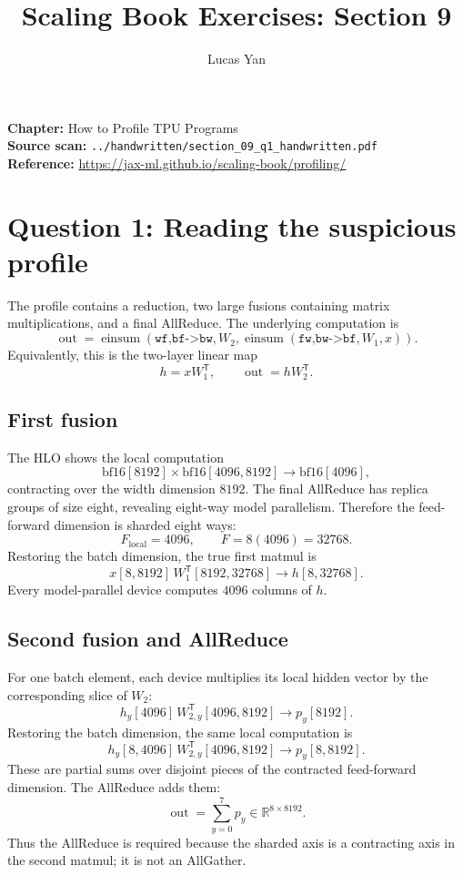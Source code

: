 \documentclass[11pt]{article}
\title{Scaling Book Exercises: Section 9}
\author{Lucas Yan}
\date{}
\begin{document}
\maketitle

\noindent
\textbf{Chapter:} How to Profile TPU Programs\\
\textbf{Source scan:} \texttt{../handwritten/section\_09\_q1\_handwritten.pdf}\\
\textbf{Reference:} \url{https://jax-ml.github.io/scaling-book/profiling/}

\section*{Question 1: Reading the suspicious profile}

The profile contains a reduction, two large fusions containing matrix
multiplications, and a final AllReduce.  The underlying computation is
\[
\operatorname{out}
=\operatorname{einsum}(\texttt{wf,bf->bw},W_2,
  \operatorname{einsum}(\texttt{fw,bw->bf},W_1,x)).
\]
Equivalently, this is the two-layer linear map
\[
h=xW_1^{\mathsf T},
\qquad
\operatorname{out}=hW_2^{\mathsf T}.
\]

\subsection*{First fusion}

The HLO shows the local computation
\[
\mathrm{bf16}[8192]\times
\mathrm{bf16}[4096,8192]
\longrightarrow
\mathrm{bf16}[4096],
\]
contracting over the width dimension \(8192\).  The final AllReduce has
replica groups of size eight, revealing eight-way model parallelism.
Therefore the feed-forward dimension is sharded eight ways:
\[
F_{\mathrm{local}}=4096,
\qquad
F=8(4096)=32768.
\]
Restoring the batch dimension, the true first matmul is
\[
\boxed{
x[8,8192]\,W_1^{\mathsf T}[8192,32768]
\longrightarrow h[8,32768]}.
\]
Every model-parallel device computes \(4096\) columns of \(h\).

\subsection*{Second fusion and AllReduce}

For one batch element, each device multiplies its local hidden vector by
the corresponding slice of \(W_2\):
\[
h_y[4096]\,W_{2,y}^{\mathsf T}[4096,8192]
\longrightarrow p_y[8192].
\]
Restoring the batch dimension, the same local computation is
\[
h_y[8,4096]\,W_{2,y}^{\mathsf T}[4096,8192]
\longrightarrow p_y[8,8192].
\]
These are partial sums over disjoint pieces of the contracted feed-forward
dimension.  The AllReduce adds them:
\[
\boxed{
\operatorname{out}
=\sum_{y=0}^{7}p_y
\in\mathbb{R}^{8\times8192}}.
\]
Thus the AllReduce is required because the sharded axis is a contracting
axis in the second matmul; it is not an AllGather.
\end{document}
